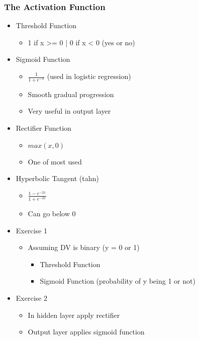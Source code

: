 \documentclass[11pt]{article}
\begin{document}
\subsubsection{The Activation Function}
\label{sec:orge54470d}

\begin{itemize}
\item Threshold Function
\begin{itemize}
\item 1 if x >= 0 | 0 if x < 0 (yes or no)
\end{itemize}
\item Sigmoid Function
\begin{itemize}
\item \(\frac{1}{1 + e^{-x}}\) (used in logistic regression)
\item Smooth gradual progression
\item Very useful in output layer
\end{itemize}
\item Rectifier Function
\begin{itemize}
\item \(max(x,0)\)
\item One of most used
\end{itemize}
\item Hyperbolic Tangent (tahn)
\begin{itemize}
\item \(\frac{1 - e^{-2x}}{ 1 + e^{-2x}}\)
\item Can go below 0
\end{itemize}

\item Exercise 1
\begin{itemize}
\item Assuming DV is binary (y = 0 or 1)
\begin{itemize}
\item Threshold Function
\item Sigmoid Function (probability of y being 1 or not)
\end{itemize}
\end{itemize}
\item Exercise 2
\begin{itemize}
\item In hidden layer apply rectifier
\item Output layer applies sigmoid function
\end{itemize}
\end{itemize}
\end{document}
